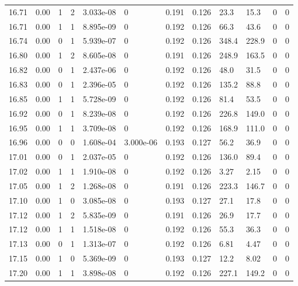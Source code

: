\documentclass[preview]{standalone}
\begin{document}
{{{{{{{{{{{{{\begin{tabular}{L{1.2cm}C{1.2cm} C{0.3cm}C{0.5cm} C{1.4cm}C{1.4cm} C{1.4cm}C{1.4cm} C{1.6cm}C{1.6cm} C{1.6cm}C{1.6cm}}
  16.71  &  0.00  & 1     &  2 &  3.033e-08  & 0  &  0.191&   0.126& 23.3 & 15.3   &  0 & 0  \\ 
  16.71  &  0.00  & 1     &  1 &  8.895e-09  & 0  &  0.192&   0.126& 66.3 & 43.6   &  0 & 0  \\ 
  16.74  &  0.00  & 0     &  1 &  5.939e-07  & 0  &  0.192&   0.126& 348.4 & 228.9   &  0 & 0  \\ 
  16.80  &  0.00  & 1     &  2 &  8.605e-08  & 0  &  0.191&   0.126& 248.9 & 163.5   &  0 & 0  \\ 
  16.82  &  0.00  & 0     &  1 &  2.437e-06  & 0  &  0.192&   0.126& 48.0 & 31.5   &  0 & 0  \\ 
  16.83  &  0.00  & 0     &  1 &  2.396e-05  & 0  &  0.192&   0.126& 135.2 & 88.8   &  0 & 0  \\ 
  16.85  &  0.00  & 1     &  1 &  5.728e-09  & 0  &  0.192&   0.126& 81.4 & 53.5   &  0 & 0  \\ 
  16.92  &  0.00  & 0     &  1 &  8.239e-08  & 0  &  0.192&   0.126& 226.8 & 149.0   &  0 & 0  \\ 
  16.95  &  0.00  & 1     &  1 &  3.709e-08  & 0  &  0.192&   0.126& 168.9 & 111.0   &  0 & 0  \\ 
  16.96  &  0.00  & 0     &  0 &  1.608e-04  & 3.000e-06  &  0.193&   0.127& 56.2 & 36.9   &  0 & 0  \\ 
  17.01  &  0.00  & 0     &  1 &  2.037e-05  & 0  &  0.192&   0.126& 136.0 & 89.4   &  0 & 0  \\ 
  17.02  &  0.00  & 1     &  1 &  1.910e-08  & 0  &  0.192&   0.126& 3.27 & 2.15   &  0 & 0  \\ 
  17.05  &  0.00  & 1     &  2 &  1.268e-08  & 0  &  0.191&   0.126& 223.3 & 146.7   &  0 & 0  \\ 
  17.10  &  0.00  & 1     &  0 &  3.085e-08  & 0  &  0.193&   0.127& 27.1 & 17.8   &  0 & 0  \\ 
  17.12  &  0.00  & 1     &  2 &  5.835e-09  & 0  &  0.191&   0.126& 26.9 & 17.7   &  0 & 0  \\ 
  17.12  &  0.00  & 1     &  1 &  1.518e-08  & 0  &  0.192&   0.126& 55.3 & 36.3   &  0 & 0  \\ 
  17.13  &  0.00  & 0     &  1 &  1.313e-07  & 0  &  0.192&   0.126& 6.81 & 4.47   &  0 & 0  \\ 
  17.15  &  0.00  & 1     &  0 &  5.369e-09  & 0  &  0.193&   0.127& 12.2 & 8.02   &  0 & 0  \\ 
  17.20  &  0.00  & 1     &  1 &  3.898e-08  & 0  &  0.192&   0.126& 227.1 & 149.2   &  0 & 0  \\ 

\end{tabular}}}}}}}}}}}}}}
\end{document}
